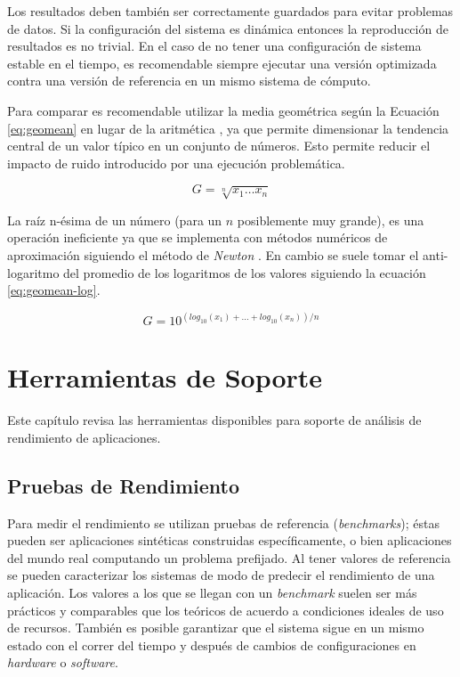 \documentclass[a4paper]{report}
\begin{document}
Los resultados deben también ser correctamente guardados para evitar
problemas de datos. Si la configuración del sistema es dinámica entonces la
reproducción de resultados es no trivial. En el caso de no tener una
configuración de sistema estable en el tiempo, es recomendable siempre
ejecutar una versión optimizada contra una versión de referencia en un mismo
sistema de cómputo.

\bigskip

Para comparar es recomendable utilizar la media geométrica según la Ecuación \ref{eq:geomean} en lugar de la aritmética \cite{how-not-to-lie}, ya que permite dimensionar la tendencia central de un valor típico en un conjunto de números. Esto permite reducir el impacto de ruido introducido por una ejecución problemática.

\begin{equation}
\label{eq:geomean}
G = \sqrt[n]{x_{1} \ldots x_{n}}
\end{equation}

La raíz n-ésima de un número (para un $ n $ posiblemente muy grande), es una operación ineficiente ya que se implementa con métodos numéricos de aproximación siguiendo el método de {\it Newton} \cite{numerical-analysis}. En cambio se suele tomar el anti-logaritmo del promedio de los logaritmos de los valores siguiendo la ecuación \ref{eq:geomean-log}.

\begin{equation}
\label{eq:geomean-log}
G = 10 ^{( log _{10} (x_{1}) + \ldots + log _{10} (x_{n}) ) / n}
\end{equation}

\chapter{Herramientas de Soporte}\label{chapter:tools}

Este capítulo revisa las herramientas disponibles para soporte de análisis
de rendimiento de aplicaciones.

\section{Pruebas de Rendimiento}

Para medir el rendimiento se utilizan pruebas de referencia ({\em benchmarks}); éstas pueden ser aplicaciones sintéticas construidas específicamente, o bien aplicaciones del mundo real computando un problema prefijado. Al tener valores de referencia se pueden caracterizar los sistemas de modo de predecir el rendimiento de una aplicación.
Los valores a los que se llegan con un {\it benchmark} suelen ser más prácticos y
comparables que los teóricos de acuerdo a condiciones ideales de uso de recursos.
También es posible garantizar que el sistema sigue en un mismo estado con el correr
del tiempo y después de cambios de configuraciones en {\it hardware} o {\it software}.
\end{document}
